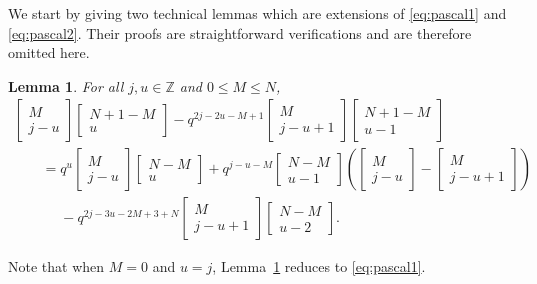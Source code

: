 \documentclass[pdftex]{sigma}
\numberwithin{equation}{section}
\newtheorem{Lemma}[Theorem]{Lemma}
\newcommand{\field}[1]{\mathbb{#1}}
\newcommand{\Z}{\field{Z}}
\begin{document}
We start by giving two technical lemmas which are extensions of \eqref{eq:pascal1} and \eqref{eq:pascal2}. Their proofs are straightforward verifications and are therefore omitted here.


\begin{Lemma}
\label{lem:tech1}
For all $j,u \in \Z$ and $0\leq M\leq N$,
\begin{gather*}
\begin{bmatrix}
M\\
j-u
\end{bmatrix} \begin{bmatrix}
N+1-M\\
u
\end{bmatrix}-q^{2j-2u-M+1}\begin{bmatrix}
M\\
j-u+1
\end{bmatrix} \begin{bmatrix}
N+1-M\\
u-1
\end{bmatrix}\\
\qquad=q^{u}\begin{bmatrix}
M\\
j-u
\end{bmatrix} \begin{bmatrix}
N-M\\
u
\end{bmatrix}
+q^{j-u-M}\begin{bmatrix}
N-M\\
u-1
\end{bmatrix}\left(\begin{bmatrix}
M\\
j-u
\end{bmatrix}-\begin{bmatrix}
M\\
j-u+1
\end{bmatrix}\right)\\
\phantom{\qquad=}{} -q^{2j-3u-2M+3+N}\begin{bmatrix}
M\\
j-u+1
\end{bmatrix} \begin{bmatrix}
N-M\\
u-2
\end{bmatrix} .
\end{gather*}
\end{Lemma}

Note that when $M=0$ and $u=j$, Lemma~\ref{lem:tech1} reduces to \eqref{eq:pascal1}.
\end{document}
